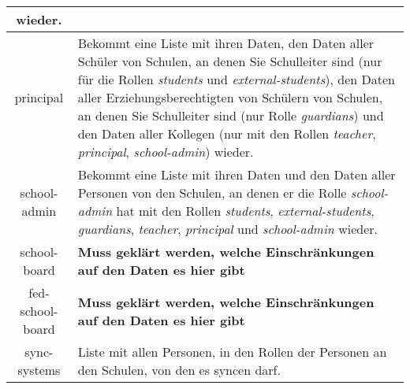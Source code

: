 \begin{longtable}{|c|p{}|}
					wieder.\\ \hline
principal & Bekommt eine Liste mit ihren Daten,
            den Daten aller Schüler von Schulen, an denen Sie Schulleiter sind (nur für die Rollen \textit{students} und \textit{external-students}),
						den Daten aller Erziehungsberechtigten von Schülern von Schulen, an denen Sie Schulleiter sind (nur Rolle \textit{guardians}) und
					  den Daten aller Kollegen (nur mit den Rollen \textit{teacher}, \textit{principal}, \textit{school-admin})
						wieder.\\ \hline
school-admin & Bekommt eine Liste mit ihren Daten und
               den Daten aller Personen von den Schulen, an denen er die Rolle \textit{school-admin} hat mit den Rollen \textit{students}, \textit{external-students}, \textit{guardians}, \textit{teacher}, \textit{principal} und \textit{school-admin} wieder.  \\ \hline
school-board & \textcolor[rgb]{1,0.41,0.13}{\textbf{Muss geklärt werden, welche Einschränkungen auf den Daten es hier gibt}} \\ \hline
fed-school-board & \textcolor[rgb]{1,0.41,0.13}{\textbf{Muss geklärt werden, welche Einschränkungen auf den Daten es hier gibt}} \\ \hline
sync-systems & Liste mit allen Personen, in den Rollen der Personen an den Schulen, von den es syncen darf. \\ \hline
	\end{longtable}
